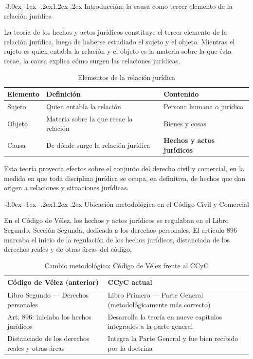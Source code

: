 \documentclass[12pt,oneside]{book}
\makeatletter
\renewcommand\section{\@startsection{section}{1}{\z@}%
  {-3.0ex \@plus -1ex \@minus -.2ex}{1.2ex \@plus .2ex}%
  {\normalfont\large\bfseries\color{acento}}}
\makeatother
\begin{document}
\section{Introducción: la causa como tercer elemento de la relación jurídica}

La teoría de los hechos y actos jurídicos constituye el tercer elemento de la relación jurídica, luego de haberse estudiado el sujeto y el objeto. Mientras el sujeto es quien entabla la relación y el objeto es la materia sobre la que ésta recae, la causa explica cómo surgen las relaciones jurídicas.

\begin{table}[H]
\centering
\caption{Elementos de la relación jurídica}
\begin{tabularx}{\textwidth}{l l X}
\toprule
\textbf{Elemento} & \textbf{Definición} & \textbf{Contenido} \\
\midrule
Sujeto & Quien entabla la relación & Persona humana o jurídica \\
Objeto & Materia sobre la que recae la relación & Bienes y cosas \\
Causa & De dónde surge la relación jurídica & \textbf{Hechos y actos jurídicos} \\
\bottomrule
\end{tabularx}
\end{table}

Esta teoría proyecta efectos sobre el conjunto del derecho civil y comercial, en la medida en que toda disciplina jurídica se ocupa, en definitiva, de hechos que dan origen a relaciones y situaciones jurídicas.

\section{Ubicación metodológica en el Código Civil y Comercial}

En el Código de Vélez, los hechos y actos jurídicos se regulaban en el Libro Segundo, Sección Segunda, dedicada a los derechos personales. El artículo 896 marcaba el inicio de la regulación de los hechos jurídicos, distanciada de los derechos reales y de otras áreas del código.

\begin{table}[H]
\centering
\caption{Cambio metodológico: Código de Vélez frente al CCyC}
\begin{tabularx}{\textwidth}{X X}
\toprule
\textbf{Código de Vélez (anterior)} & \textbf{CCyC actual} \\
\midrule
Libro Segundo --- Derechos personales & Libro Primero --- Parte General (metodológicamente más correcto) \\
Art. 896: iniciaba los hechos jurídicos & Desarrolla la teoría en nueve capítulos integrados a la parte general \\
Distanciado de los derechos reales y otras áreas & Integra la Parte General y fue bien recibido por la doctrina \\
\bottomrule
\end{tabularx}
\end{table}
\end{document}

